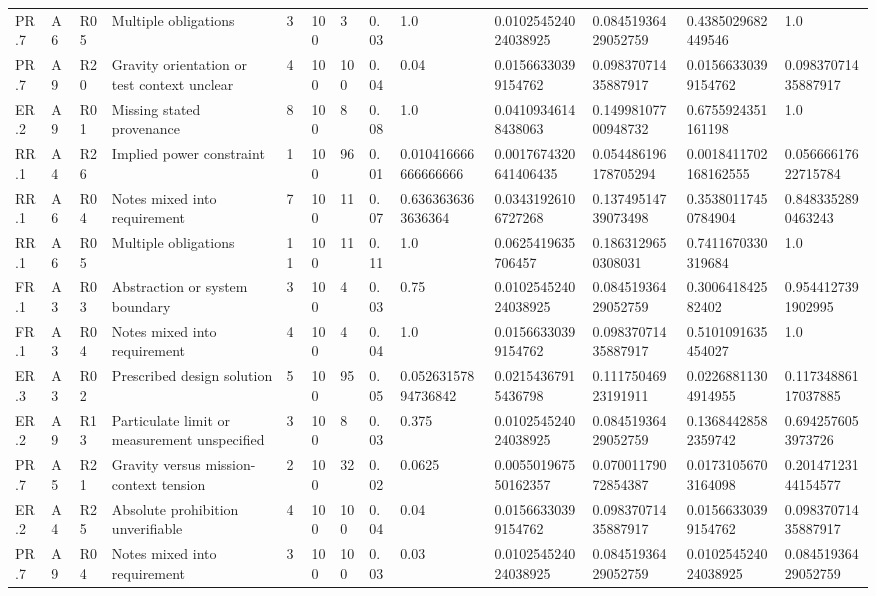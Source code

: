 \begin{tabular}{lllllllllllll}
PR.7 & A6 & R05 & Multiple obligations & 3 & 100 & 3 & 0.03 & 1.0 & 0.010254524024038925 & 0.08451936429052759 & 0.4385029682449546 & 1.0 \\
PR.7 & A9 & R20 & Gravity orientation or test context unclear & 4 & 100 & 100 & 0.04 & 0.04 & 0.01566330399154762 & 0.09837071435887917 & 0.01566330399154762 & 0.09837071435887917 \\
ER.2 & A9 & R01 & Missing stated provenance & 8 & 100 & 8 & 0.08 & 1.0 & 0.04109346148438063 & 0.14998107700948732 & 0.6755924351161198 & 1.0 \\
RR.1 & A4 & R26 & Implied power constraint & 1 & 100 & 96 & 0.01 & 0.010416666666666666 & 0.0017674320641406435 & 0.054486196178705294 & 0.0018411702168162555 & 0.05666617622715784 \\
RR.1 & A6 & R04 & Notes mixed into requirement & 7 & 100 & 11 & 0.07 & 0.6363636363636364 & 0.03431926106727268 & 0.13749514739073498 & 0.35380117450784904 & 0.8483352890463243 \\
RR.1 & A6 & R05 & Multiple obligations & 11 & 100 & 11 & 0.11 & 1.0 & 0.0625419635706457 & 0.1863129650308031 & 0.7411670330319684 & 1.0 \\
FR.1 & A3 & R03 & Abstraction or system boundary & 3 & 100 & 4 & 0.03 & 0.75 & 0.010254524024038925 & 0.08451936429052759 & 0.300641842582402 & 0.9544127391902995 \\
FR.1 & A3 & R04 & Notes mixed into requirement & 4 & 100 & 4 & 0.04 & 1.0 & 0.01566330399154762 & 0.09837071435887917 & 0.5101091635454027 & 1.0 \\
ER.3 & A3 & R02 & Prescribed design solution & 5 & 100 & 95 & 0.05 & 0.05263157894736842 & 0.02154367915436798 & 0.11175046923191911 & 0.02268811304914955 & 0.11734886117037885 \\
ER.2 & A9 & R13 & Particulate limit or measurement unspecified & 3 & 100 & 8 & 0.03 & 0.375 & 0.010254524024038925 & 0.08451936429052759 & 0.13684428582359742 & 0.6942576053973726 \\
PR.7 & A5 & R21 & Gravity versus mission-context tension & 2 & 100 & 32 & 0.02 & 0.0625 & 0.005501967550162357 & 0.07001179072854387 & 0.01731056703164098 & 0.20147123144154577 \\
ER.2 & A4 & R25 & Absolute prohibition unverifiable & 4 & 100 & 100 & 0.04 & 0.04 & 0.01566330399154762 & 0.09837071435887917 & 0.01566330399154762 & 0.09837071435887917 \\
PR.7 & A9 & R04 & Notes mixed into requirement & 3 & 100 & 100 & 0.03 & 0.03 & 0.010254524024038925 & 0.08451936429052759 & 0.010254524024038925 & 0.08451936429052759 \\

\end{tabular}
